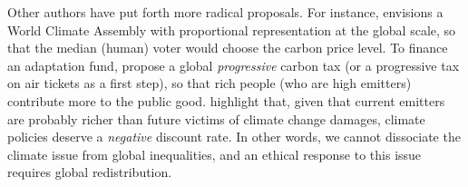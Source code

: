 Other authors have put forth more radical proposals. For instance,  envisions a World Climate Assembly with proportional representation at the global scale, so that the median (human) voter would choose the carbon price level. %
To finance an adaptation fund,  propose a global \textit{progressive} carbon tax (or a progressive tax on air tickets as a first step), so that rich people (who are high emitters) contribute more to the public good. 
 highlight that, given that current emitters are probably richer than future victims of climate change damages, climate policies deserve a \textit{negative} discount rate. In other words, we cannot dissociate the climate issue from global inequalities, and an ethical response to this issue requires global redistribution. 

